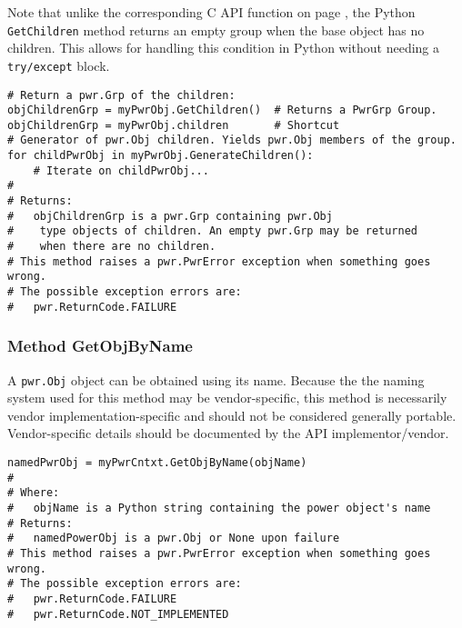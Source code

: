 Note that unlike the corresponding C API function on page
\pageref{func:ObjGetChildren}, the Python \texttt{GetChildren} method returns an empty
group when the base object has no children. This allows for handling this
condition in Python without needing a \texttt{try/except} block.

\begin{center}\begin{minipage}{.95\linewidth}\begin{lstlisting}
# Return a pwr.Grp of the children:
objChildrenGrp = myPwrObj.GetChildren()  # Returns a PwrGrp Group.
objChildrenGrp = myPwrObj.children       # Shortcut
# Generator of pwr.Obj children. Yields pwr.Obj members of the group.
for childPwrObj in myPwrObj.GenerateChildren():
    # Iterate on childPwrObj...
#
# Returns:
#   objChildrenGrp is a pwr.Grp containing pwr.Obj
#    type objects of children. An empty pwr.Grp may be returned
#    when there are no children.
# This method raises a pwr.PwrError exception when something goes wrong.
# The possible exception errors are:
#   pwr.ReturnCode.FAILURE
\end{lstlisting}\end{minipage}\end{center}

\subsubsection{Method GetObjByName} \label{meth:GetObjByName}

A \texttt{pwr.Obj} object can be obtained using its name. Because the
the naming system used for this method may be vendor-specific, this method is
necessarily vendor implementation-specific and should not be considered
generally portable. Vendor-specific details should be documented by the API
implementor/vendor.

\begin{center}\begin{minipage}{.95\linewidth}\begin{lstlisting}
namedPwrObj = myPwrCntxt.GetObjByName(objName)
#
# Where:
#   objName is a Python string containing the power object's name
# Returns:
#   namedPowerObj is a pwr.Obj or None upon failure
# This method raises a pwr.PwrError exception when something goes wrong.
# The possible exception errors are:
#   pwr.ReturnCode.FAILURE
#   pwr.ReturnCode.NOT_IMPLEMENTED
\end{lstlisting}\end{minipage}\end{center}

